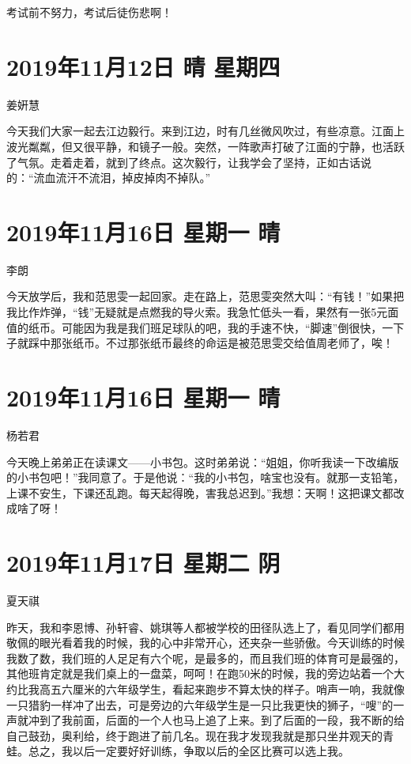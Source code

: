考试前不努力，考试后徒伤悲啊！

\section{2019年11月12日 晴 星期四}

姜姸慧

今天我们大家一起去江边毅行。来到江边，时有几丝微风吹过，有些凉意。江面上波光粼粼，但又很平静，和镜子一般。突然，一阵歌声打破了江面的宁静，也活跃了气氛。走着走着，就到了终点。这次毅行，让我学会了坚持，正如古话说的：``流血流汗不流泪，掉皮掉肉不掉队。''

\section{2019年11月16日 星期一 晴}

李朗

今天放学后，我和范思雯一起回家。走在路上，范思雯突然大叫：``有钱！''如果把我比作炸弹，``钱''无疑就是点燃我的导火索。我急忙低头一看，果然有一张5元面值的纸币。可能因为我是我们班足球队的吧，我的手速不快，``脚速''倒很快，一下子就踩中那张纸币。不过那张纸币最终的命运是被范思雯交给值周老师了，唉！

\section{2019年11月16日 星期一 晴}

杨若君

今天晚上弟弟正在读课文------小书包。这时弟弟说：``姐姐，你听我读一下改编版的小书包吧！''我同意了。于是他说：``我的小书包，啥宝也没有。就那一支铅笔，上课不安生，下课还乱跑。每天起得晚，害我总迟到。''我想：天啊！这把课文都改成啥了呀！

\section{2019年11月17日 星期二 阴}

夏天祺

昨天，我和李恩博、孙轩睿、姚琪等人都被学校的田径队选上了，看见同学们都用敬佩的眼光看着我的时候，我的心中非常开心，还夹杂一些骄傲。今天训练的时候我数了数，我们班的人足足有六个呢，是最多的，而且我们班的体育可是最强的，其他班肯定就是我们桌上的一盘菜，呵呵！在跑50米的时候，我的旁边站着一个大约比我高五六厘米的六年级学生，看起来跑步不算太快的样子。哨声一响，我就像一只猎豹一样冲了出去，可是旁边的六年级学生是一只比我更快的狮子，``嗖''的一声就冲到了我前面，后面的一个人也马上追了上来。到了后面的一段，我不断的给自己鼓劲，奥利给，终于跑进了前几名。现在我才发现我就是那只坐井观天的青蛙。总之，我以后一定要好好训练，争取以后的全区比赛可以选上我。


